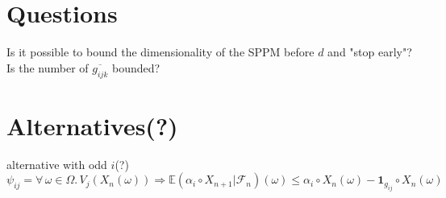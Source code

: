 \documentclass[12pt]{article}
\begin{document}
\section{Questions}
Is it possible to bound the dimensionality of the SPPM before $d$ and "stop early"?\\
Is the number of $\overline{g_{ijk}}$ bounded?

\newpage

\section{Alternatives(?)}
alternative with odd $i$(?)
\[
	\psi_{ij} = \forall\, \omega \in \Omega.\,V_j(X_n(\omega)) \Rightarrow \mathbb{E}(\alpha_i\circ X_{n+1}|\mathcal{F}_n)(\omega) \le \alpha_i\circ X_n(\omega) - \mathbf{1}_{g_{ij}}\circ X_n(\omega)
\]
\end{document}
